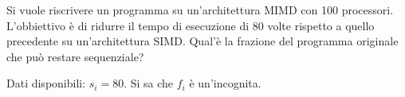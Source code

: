 \begin{exercise}
	Si vuole riscrivere un programma su un'architettura MIMD con 100 processori. L'obbiettivo è di ridurre il tempo di esecuzione di 80 volte rispetto a quello precedente su un'architettura SIMD. Qual'è la frazione del programma originale che può restare sequenziale?
\end{exercise}
\begin{solution}
	Dati disponibili: $s_i = 80$. Si sa che $f_i$ è un'incognita.
\end{solution}
